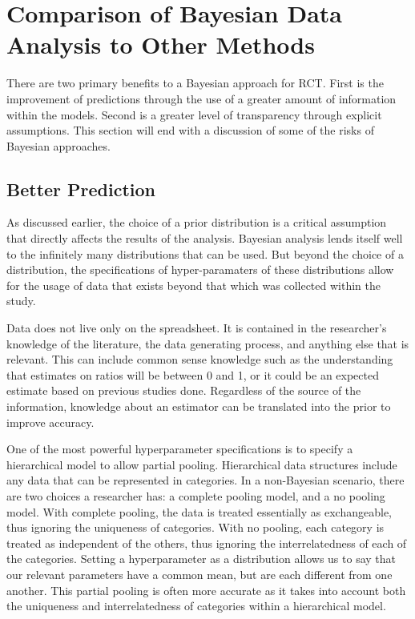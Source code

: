 \documentclass[12pt, oneside]{article}
\begin{document}
\section{Comparison of Bayesian Data Analysis to Other Methods}
There are two primary benefits to a Bayesian approach for RCT. First is the improvement of predictions through the use of a greater amount of information within the models. Second is a greater level of transparency through explicit assumptions. This section will end with a discussion of some of the risks of Bayesian approaches.
\subsection{Better Prediction}
As discussed earlier, the choice of a prior distribution is a critical assumption that directly affects the results of the analysis. Bayesian analysis lends itself well to the infinitely many distributions that can be used. But beyond the choice of a distribution, the specifications of hyper-paramaters of these distributions allow for the usage of data that exists beyond that which was collected within the study. 

Data does not live only on the spreadsheet. It is contained in the researcher's knowledge of the literature, the data generating process, and anything else that is relevant. This can include common sense knowledge such as the understanding that estimates on ratios will be between 0 and 1, or it could be an expected estimate based on previous studies done. Regardless of the source of the information, knowledge about an estimator can be translated into the prior to improve accuracy. 

One of the most powerful hyperparameter specifications is to specify a hierarchical model to allow partial pooling. Hierarchical data structures include any data that can be represented in categories. In a non-Bayesian scenario, there are two choices a researcher has: a complete pooling model, and a no pooling model. With complete pooling, the data is treated essentially as exchangeable, thus ignoring the uniqueness of categories. With no pooling, each category is treated as independent of the others, thus ignoring the interrelatedness of each of the categories. Setting a hyperparameter as a distribution allows us to say that our relevant parameters have a common mean, but are each different from one another. This partial pooling is often more accurate as it takes into account both the uniqueness and interrelatedness of categories within a hierarchical model.
\end{document}
